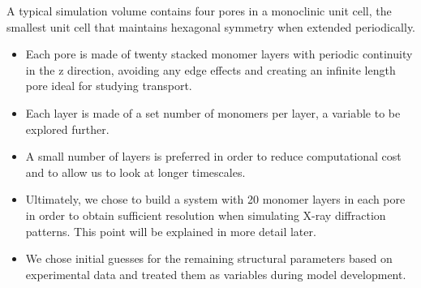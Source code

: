 \documentclass{article}
\begin{document}
  A typical simulation volume contains four pores in a monoclinic unit cell,
  the smallest unit cell that maintains hexagonal symmetry when extended 
  periodically.
  \begin{itemize}
    \item Each pore is made of twenty stacked monomer layers with periodic 
    continuity in the z direction, avoiding any edge effects and creating an 
    infinite length pore ideal for studying transport.
    \item Each layer is made of a set number of monomers per layer, a variable to
    be explored further.
    \item A small number of layers is preferred in order to reduce computational
    cost and to allow us to look at longer timescales.
    \item Ultimately, we chose to build a system with 20 monomer layers in each pore
    in order to obtain sufficient resolution when simulating X-ray diffraction patterns.
    This point will be explained in more detail later.
    \item We chose initial guesses for the remaining structural parameters based on
    experimental data and treated them as variables during model development.
  \end{itemize}
  
\end{document}
